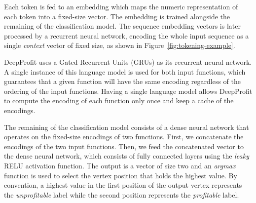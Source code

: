 Each token is fed to an embedding which maps the numeric representation of each token into a fixed-size vector.
The embedding is trained alongside the remaining of the classification model.
The sequence embedding vectors is later processed by a recurrent neural network, encoding the whole input sequence as a single \textit{context} vector of fixed size, as shown in Figure~\ref{fig:tokening-example}.

DeepProfit uses a Gated Recurrent Units (GRUs) as its recurrent neural network.
A single instance of this language model is used for both input functions, which guarantees that a given function will have the same encoding regardless of the ordering of the input functions.
Having a single language model allows DeepProfit to compute the encoding of each function only once and keep a cache of the encodings.

The remaining of the classification model consists of a dense neural network that operates on the fixed-size encodings of two functions.
First, we concatenate the encodings of the two input functions.
Then, we feed the concatenated vector to the dense neural network, which consists of fully connected layers using the \textit{leaky} RELU activation function.
The output is a vector of size two and an \textit{argmax} function is used to select the vertex position that holds the highest value.
By convention, a highest value in the first position of the output vertex represents the \textit{unprofitable} label while the second position represents the \textit{profitable} label.



